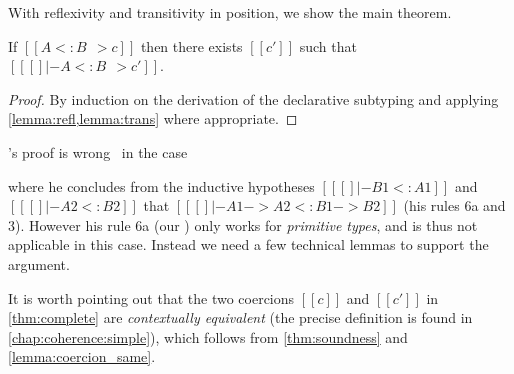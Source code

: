 With reflexivity and transitivity in position, we show the main theorem.

\begin{theorem}[Completeness] \label{thm:complete}
  If $[[A <: B ~~> c]]$ then there exists $[[c']]$ such that $[[ [] |- A <: B ~~> c']]$.
\end{theorem}
\begin{proof}
  By induction on the derivation of the declarative subtyping and applying \cref{lemma:refl,lemma:trans} where appropriate.
\end{proof}
\begin{remark}
  \citeauthor{pierce1989decision}'s proof is wrong~\cite[pp.~20, Case~F]{pierce1989decision} in the case
  \begin{mathpar}
  \end{mathpar}
  where he concludes from the inductive
  hypotheses $[[ [] |- B1 <: A1]]$ and $[[ [] |- A2 <: B2]]$ that $[[ [] |- A1 -> A2 <: B1 -> B2]]$ (his rules 6a and 3).
  However his rule 6a (our ) only works for \textit{primitive types}, and is thus not applicable in this case. Instead we
  need a few technical lemmas to support the argument.
\end{remark}

\begin{remark}
  It is worth pointing out that the two coercions $[[c]]$ and $[[c']]$ in
  \cref{thm:complete} are \textit{contextually equivalent} (the precise
  definition is found in \cref{chap:coherence:simple}), which follows from
  \cref{thm:soundness} and \cref{lemma:coercion_same}.
\end{remark}

